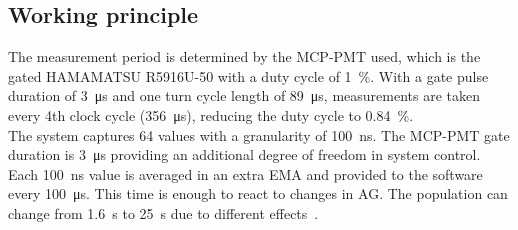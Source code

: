 \subsection{Working principle}
The measurement period is determined by the MCP-PMT used, which is the gated
HAMAMATSU R5916U-50 with a duty cycle of \SI{1}{\%}. With a gate pulse duration
of \SI{3}{\micro\second} and one turn cycle length of \SI{89}{\micro\second},
measurements are taken every 4th clock cycle (\SI{356}{\micro\second}),
reducing the duty cycle to \SI{0.84}{\%}.\\
The system captures 64 values with a granularity of \SI{100}{\nano\second}. The
MCP-PMT gate duration is \SI{3}{\micro\second} providing an additional degree of
freedom in system control. Each \SI{100}{\nano\second} value is averaged in an
extra EMA and provided to the software every \SI{100}{\micro\second}. This
time is enough to react to changes in AG. The population can change from
\SI{1.6}{\second} to \SI{25}{\second} due to different
effects~\cite{high_sensitivity_measurement}.

